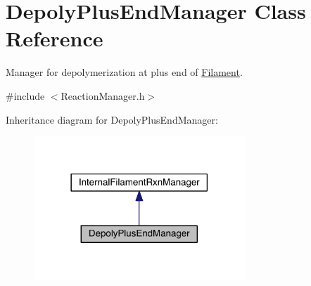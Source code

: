 \hypertarget{classDepolyPlusEndManager}{\section{Depoly\+Plus\+End\+Manager Class Reference}
\label{classDepolyPlusEndManager}
}


Manager for depolymerization at plus end of \hyperlink{classFilament}{Filament}.  




{\ttfamily \#include $<$Reaction\+Manager.\+h$>$}



Inheritance diagram for Depoly\+Plus\+End\+Manager\+:\nopagebreak
\begin{figure}[H]
\begin{center}
\leavevmode
\includegraphics[width=225pt]{classDepolyPlusEndManager__inherit__graph}
\end{center}
\end{figure}



